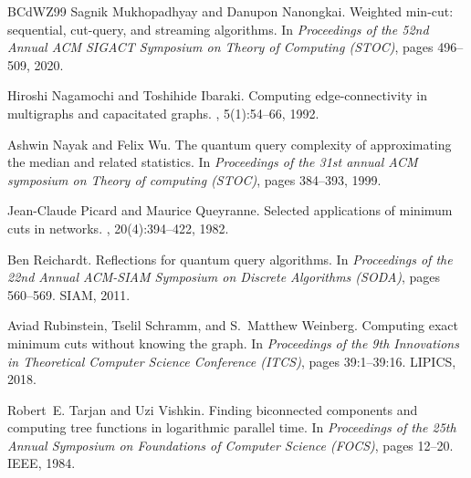 \documentclass[10pt,a4paper]{article}
\newcommand{\1}{\mathbf{1}}
\theoremstyle{definition}
\begin{document}
\begin{thebibliography}{BCdWZ99}
Sagnik Mukhopadhyay and Danupon Nanongkai.
\newblock Weighted min-cut: sequential, cut-query, and streaming algorithms.
\newblock In {\em Proceedings of the 52nd Annual ACM SIGACT Symposium on Theory
  of Computing (STOC)}, pages 496--509, 2020.

Hiroshi Nagamochi and Toshihide Ibaraki.
\newblock Computing edge-connectivity in multigraphs and capacitated graphs.
, 5(1):54--66, 1992.

Ashwin Nayak and Felix Wu.
\newblock The quantum query complexity of approximating the median and related
  statistics.
\newblock In {\em Proceedings of the 31st annual ACM symposium on Theory of
  computing (STOC)}, pages 384--393, 1999.

Jean-Claude Picard and Maurice Queyranne.
\newblock Selected applications of minimum cuts in networks.
,
  20(4):394--422, 1982.

Ben Reichardt.
\newblock Reflections for quantum query algorithms.
\newblock In {\em Proceedings of the 22nd Annual {ACM-SIAM} Symposium on
  Discrete Algorithms (SODA)}, pages 560--569. {SIAM}, 2011.
  
Aviad Rubinstein, Tselil Schramm, and S.~Matthew Weinberg.
\newblock Computing exact minimum cuts without knowing the graph.
\newblock In {\em Proceedings of the 9th Innovations in Theoretical Computer
  Science Conference (ITCS)}, pages 39:1--39:16. LIPICS, 2018.

Robert~E. Tarjan and Uzi Vishkin.
\newblock Finding biconnected components and computing tree functions in
  logarithmic parallel time.
\newblock In {\em Proceedings of the 25th Annual Symposium on Foundations of
  Computer Science (FOCS)}, pages 12--20. IEEE, 1984.

\end{thebibliography}
  
\end{document}
